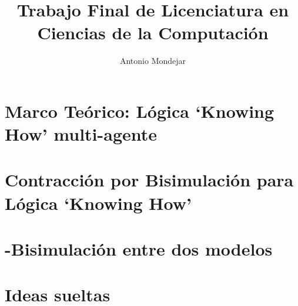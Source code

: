 \documentclass[a4paper,10pt]{article}
\begin{document}
\title{Trabajo Final de Licenciatura en Ciencias de la Computación}

\author{Antonio Mondejar}

\maketitle

\section{Marco Teórico: Lógica `Knowing How' multi-agente}
    

\section{Contracción por Bisimulación para Lógica `Knowing How'}
    

\section{\KHilogic-Bisimulación entre dos modelos}
    

\section{Ideas sueltas}
    
\end{document}
